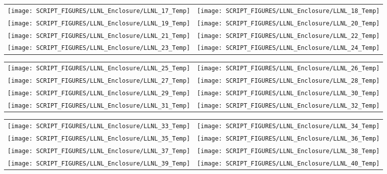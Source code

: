 \begin{figure}[!ht]
\begin{tabular*}{\textwidth}{l@{\extracolsep{\fill}}r}
\texttt{[image: SCRIPT\_FIGURES/LLNL\_Enclosure/LLNL\_17\_Temp]} &
\texttt{[image: SCRIPT\_FIGURES/LLNL\_Enclosure/LLNL\_18\_Temp]} \\
\texttt{[image: SCRIPT\_FIGURES/LLNL\_Enclosure/LLNL\_19\_Temp]} &
\texttt{[image: SCRIPT\_FIGURES/LLNL\_Enclosure/LLNL\_20\_Temp]} \\
\texttt{[image: SCRIPT\_FIGURES/LLNL\_Enclosure/LLNL\_21\_Temp]} &
\texttt{[image: SCRIPT\_FIGURES/LLNL\_Enclosure/LLNL\_22\_Temp]} \\
\texttt{[image: SCRIPT\_FIGURES/LLNL\_Enclosure/LLNL\_23\_Temp]} &
\texttt{[image: SCRIPT\_FIGURES/LLNL\_Enclosure/LLNL\_24\_Temp]}
\end{tabular*}
\label{LLNL_Enclosure_Temp_3}
\end{figure}

\begin{figure}[!ht]
\begin{tabular*}{\textwidth}{l@{\extracolsep{\fill}}r}
\texttt{[image: SCRIPT\_FIGURES/LLNL\_Enclosure/LLNL\_25\_Temp]} &
\texttt{[image: SCRIPT\_FIGURES/LLNL\_Enclosure/LLNL\_26\_Temp]} \\
\texttt{[image: SCRIPT\_FIGURES/LLNL\_Enclosure/LLNL\_27\_Temp]} &
\texttt{[image: SCRIPT\_FIGURES/LLNL\_Enclosure/LLNL\_28\_Temp]} \\
\texttt{[image: SCRIPT\_FIGURES/LLNL\_Enclosure/LLNL\_29\_Temp]} &
\texttt{[image: SCRIPT\_FIGURES/LLNL\_Enclosure/LLNL\_30\_Temp]} \\
\texttt{[image: SCRIPT\_FIGURES/LLNL\_Enclosure/LLNL\_31\_Temp]} &
\texttt{[image: SCRIPT\_FIGURES/LLNL\_Enclosure/LLNL\_32\_Temp]}
\end{tabular*}
\label{LLNL_Enclosure_Temp_4}
\end{figure}

\begin{figure}[!ht]
\begin{tabular*}{\textwidth}{l@{\extracolsep{\fill}}r}
\texttt{[image: SCRIPT\_FIGURES/LLNL\_Enclosure/LLNL\_33\_Temp]} &
\texttt{[image: SCRIPT\_FIGURES/LLNL\_Enclosure/LLNL\_34\_Temp]} \\
\texttt{[image: SCRIPT\_FIGURES/LLNL\_Enclosure/LLNL\_35\_Temp]} &
\texttt{[image: SCRIPT\_FIGURES/LLNL\_Enclosure/LLNL\_36\_Temp]} \\
\texttt{[image: SCRIPT\_FIGURES/LLNL\_Enclosure/LLNL\_37\_Temp]} &
\texttt{[image: SCRIPT\_FIGURES/LLNL\_Enclosure/LLNL\_38\_Temp]} \\
\texttt{[image: SCRIPT\_FIGURES/LLNL\_Enclosure/LLNL\_39\_Temp]} &
\texttt{[image: SCRIPT\_FIGURES/LLNL\_Enclosure/LLNL\_40\_Temp]}
\end{tabular*}
\label{LLNL_Enclosure_Temp_5}
\end{figure}

